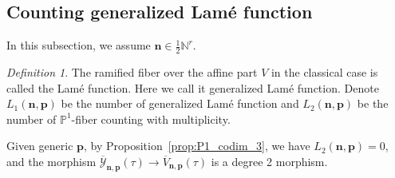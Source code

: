 \documentclass[11pt]{amsart}
\theoremstyle{remark}
\newtheorem{definition}[theorem]{Definition}
\numberwithin{equation}{section}
\begin{document}
\subsection{Counting generalized Lam\'e function}
In this subsection, we assume $\mathbf{n} \in \tfrac{1}{2}\mathbb{N}^r$.
\begin{definition}
The ramified fiber over the affine part $V$ in the classical case is called the Lam\'e function. Here we call it generalized Lam\'e function. Denote $L_1(\mathbf{n},\mathbf{p})$ be the number of generalized Lam\'e function and $L_2(\mathbf{n},\mathbf{p})$ be the number of $\mathbb{P}^1$-fiber counting with multiplicity. 
\end{definition}

Given generic $\mathbf{p}$, by Proposition~\ref{prop:P1_codim_3}, we have $L_2(\mathbf{n},\mathbf{p}) =0$, and the morphism $\overline{\mathcal{Y}}_{\mathbf{n},\mathbf{p}}(\tau) \rightarrow \overline{V}_{\mathbf{n},\mathbf{p}}(\tau)$ is a degree 2 morphism. 
\end{document}

